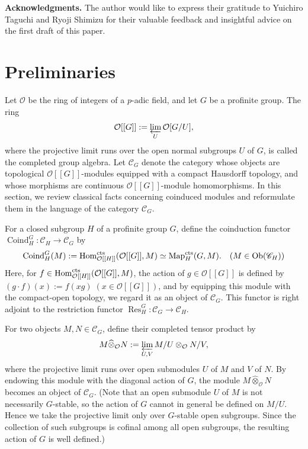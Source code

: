 \documentclass{article}
\numberwithin{equation}{section} %
\begin{document}
    \vspace{0.2cm}
    \textbf{Acknowledgments.} The author would like to express their gratitude to Yuichiro Taguchi and Ryoji Shimizu for their valuable feedback and insightful advice on the first draft of this paper.
    
    \section{Preliminaries}

Let $\mathcal{O}$ be the ring of integers of a $p$-adic field, and let $G$ be a profinite group. The ring
\[
\mathcal{O}[[G]] := \varprojlim_U \mathcal{O}[G/U],
\]
where the projective limit runs over the open normal subgroups $U$ of $G$, is called the completed group algebra. Let $\mathscr{C}_G$ denote the category whose objects are topological $\mathcal{O}[[G]]$-modules equipped with a compact Hausdorff topology, and whose morphisms are continuous $\mathcal{O}[[G]]$-module homomorphisms. In this section, we review classical facts concerning coinduced modules and reformulate them in the language of the category $\mathscr{C}_G$.

For a closed subgroup $H$ of a profinite group $G$, define the coinduction functor $\operatorname{Coind}_H^G : \mathscr{C}_H \to \mathscr{C}_G$ by
\begin{align*}
  \operatorname{Coind}_H^G(M)
  := \operatorname{Hom}_{\mathcal{O}[[H]]}^{\rm cts}(\mathcal{O}[[G]],M)
  \simeq \operatorname{Map}_H^{\rm cts}(G,M). \quad (M \in \operatorname{Ob}(\mathscr{C}_H))
\end{align*}
Here, for $f \in \operatorname{Hom}_{\mathcal{O}[[H]]}^{\rm cts}(\mathcal{O}[[G]],M)$, the action of $g \in \mathcal{O}[[G]]$ is defined by $(g\cdot f)(x) := f(xg)
\; (x\in \mathcal{O}[[G]])$, and by equipping this module with the compact-open topology, we regard it as an object of $\mathscr{C}_G$. This functor is right adjoint to the restriction functor $\operatorname{Res}_H^G : \mathscr{C}_G \to \mathscr{C}_H$.

For two objects $M,N \in \mathscr{C}_G$, define their completed tensor product by
\[
  M \widehat{\otimes}_{\mathcal{O}} N
  := \varprojlim_{U,V} M/U \otimes_{\mathcal{O}} N/V,
\]
where the projective limit runs over open submodules $U$ of $M$ and $V$ of $N$. By endowing this module with the diagonal action of $G$, the module $M \widehat{\otimes}_{\mathcal{O}} N$ becomes an object of $\mathscr{C}_G$. (Note that an open submodule $U$ of $M$ is not necessarily $G$-stable, so the action of $G$ cannot in general be defined on $M/U$. Hence we take the projective limit only over $G$-stable open subgroups. Since the collection of such subgroups is cofinal among all open subgroups, the resulting action of $G$ is well defined.)
\end{document}
